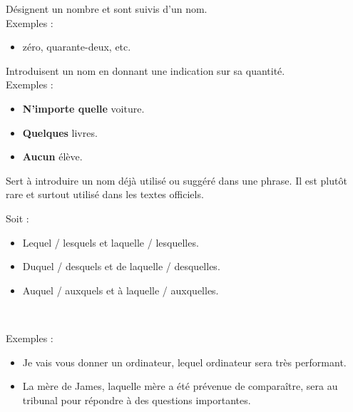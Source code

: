 \documentclass[10pt, french]{article}
\begin{document}
\begin{multicols*}{2}
\begin{definitionNOHFILLsub}
Désignent un nombre et sont suivis d'un nom.	\\

Exemples :
\begin{itemize}
	\item	zéro, quarante-deux, etc.
\end{itemize}
\end{definitionNOHFILLsub}

\begin{definitionNOHFILLsub}
Introduisent un nom en donnant une indication sur sa quantité.	\\

Exemples :
\begin{itemize}
	\item	\textbf{N'importe quelle} voiture.
	\item	\textbf{Quelques} livres.
	\item	\textbf{Aucun} élève.
\end{itemize}
\end{definitionNOHFILLsub}

\begin{definitionNOHFILLsub}
Sert à introduire un nom déjà utilisé ou suggéré dans une phrase. Il est plutôt rare et surtout utilisé dans les textes officiels.

Soit : 
\begin{itemize}
	\item	Lequel / lesquels et laquelle / lesquelles.
	\item	Duquel / desquels et de laquelle / desquelles.
	\item	Auquel / auxquels et à laquelle / auxquelles.
\end{itemize}

\

Exemples : 
\begin{itemize}
	\item	Je vais vous donner un ordinateur, lequel ordinateur sera très performant.
	\item	La mère de James, laquelle mère a été prévenue de comparaître, sera au tribunal pour répondre à des questions importantes.
\end{itemize}
\end{definitionNOHFILLsub}


\columnbreak

\end{multicols*}
\end{document}
